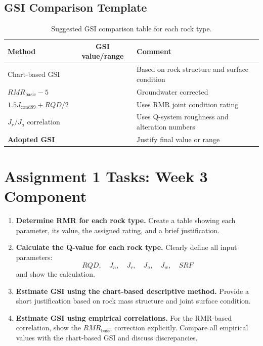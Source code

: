 \documentclass[a4paper,12pt]{article}
\begin{document}
\subsection{GSI Comparison Template}

\begin{table}[H]
\centering
\small
\begin{tabularx}{\textwidth}{l c Y}
\toprule
\textbf{Method} & \textbf{GSI value/range} & \textbf{Comment} \\
\midrule
Chart-based GSI &  & Based on rock structure and surface condition \\
\(RMR_{\text{basic}}-5\) &  & Groundwater corrected \\
\(1.5J_{\text{cond89}}+RQD/2\) &  & Uses RMR joint condition rating \\
\(J_r/J_a\) correlation &  & Uses Q-system roughness and alteration numbers \\
\midrule
\textbf{Adopted GSI} &  & Justify final value or range \\
\bottomrule
\end{tabularx}
\caption{Suggested GSI comparison table for each rock type.}
\label{tab:gsi_template}
\end{table}

\section{Assignment 1 Tasks: Week 3 Component}

\begin{enumerate}
    \item \textbf{Determine RMR for each rock type.}
    Create a table showing each parameter, its value, the assigned rating, and a brief
    justification.

    \item \textbf{Calculate the Q-value for each rock type.}
    Clearly define all input parameters:
    \[
    RQD,\quad J_n,\quad J_r,\quad J_a,\quad J_w,\quad SRF
    \]
    and show the calculation.

    \item \textbf{Estimate GSI using the chart-based descriptive method.}
    Provide a short justification based on rock mass structure and joint surface condition.

    \item \textbf{Estimate GSI using empirical correlations.}
    For the RMR-based correlation, show the \(RMR_{\text{basic}}\) correction explicitly.
    Compare all empirical values with the chart-based GSI and discuss discrepancies.
\end{enumerate}
\end{document}
